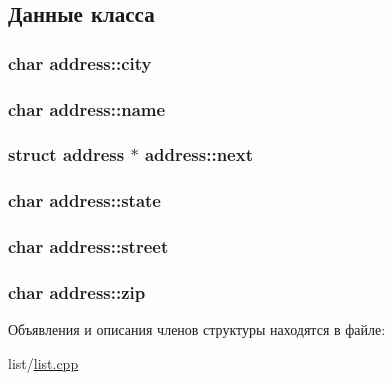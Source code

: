 \subsection{Данные класса}
\hypertarget{structaddress_a0c78bb35ec35cbad5ce3d6741de018e0}{
\subsubsection[{city}]{\setlength{\rightskip}{0pt plus 5cm}char address\-::city}}\label{structaddress_a0c78bb35ec35cbad5ce3d6741de018e0}
\hypertarget{structaddress_a6e6c496beec05d918fc03afb8ab140ef}{
\subsubsection[{name}]{\setlength{\rightskip}{0pt plus 5cm}char address\-::name}}\label{structaddress_a6e6c496beec05d918fc03afb8ab140ef}
\hypertarget{structaddress_aad59261f2867a30d99b5707b0b0a4ce5}{
\subsubsection[{next}]{\setlength{\rightskip}{0pt plus 5cm}struct {\bf address} $\ast$ address\-::next}}\label{structaddress_aad59261f2867a30d99b5707b0b0a4ce5}
\hypertarget{structaddress_a461a1fbc2cf76f0ad1ff1a9ce56c7f27}{
\subsubsection[{state}]{\setlength{\rightskip}{0pt plus 5cm}char address\-::state}}\label{structaddress_a461a1fbc2cf76f0ad1ff1a9ce56c7f27}
\hypertarget{structaddress_a1b54cdcd27d206d5c0beab8ec87c68ad}{
\subsubsection[{street}]{\setlength{\rightskip}{0pt plus 5cm}char address\-::street}}\label{structaddress_a1b54cdcd27d206d5c0beab8ec87c68ad}
\hypertarget{structaddress_aec1400bd12120a14f89c8329737e5779}{
\subsubsection[{zip}]{\setlength{\rightskip}{0pt plus 5cm}char address\-::zip}}\label{structaddress_aec1400bd12120a14f89c8329737e5779}


Объявления и описания членов структуры находятся в файле\-:\begin{DoxyCompactItemize}
\item 
list/\hyperlink{list_2list_8cpp}{list.\-cpp}\end{DoxyCompactItemize}
